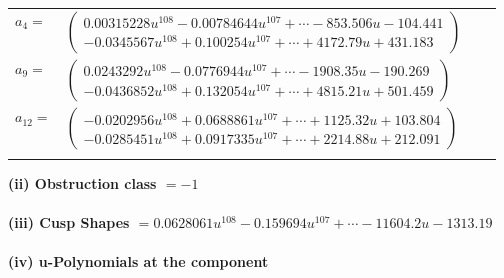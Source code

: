 \documentclass[1p]{elsarticle_modified}
\theoremstyle{definition}
\begin{document}
\begin{tabular}{m{7pt} m{180pt} m{7pt} m{180pt} }
\flushright $a_{4}=$&$\begin{pmatrix}0.00315228 u^{108}-0.00784644 u^{107}+\cdots-853.506 u-104.441\\-0.0345567 u^{108}+0.100254 u^{107}+\cdots+4172.79 u+431.183\end{pmatrix}$ \\
\flushright $a_{9}=$&$\begin{pmatrix}0.0243292 u^{108}-0.0776944 u^{107}+\cdots-1908.35 u-190.269\\-0.0436852 u^{108}+0.132054 u^{107}+\cdots+4815.21 u+501.459\end{pmatrix}$ \\
\flushright $a_{12}=$&$\begin{pmatrix}-0.0202956 u^{108}+0.0688861 u^{107}+\cdots+1125.32 u+103.804\\-0.0285451 u^{108}+0.0917335 u^{107}+\cdots+2214.88 u+212.091\end{pmatrix}$\\&\end{tabular}
\flushleft \textbf{(ii) Obstruction class $= -1$}\\~\\
\flushleft \textbf{(iii) Cusp Shapes $= 0.0628061 u^{108}-0.159694 u^{107}+\cdots-11604.2 u-1313.19$}\\~\\
\newpage\renewcommand{\arraystretch}{1}
\flushleft \textbf{(iv) u-Polynomials at the component}\newline \\
\end{document}

